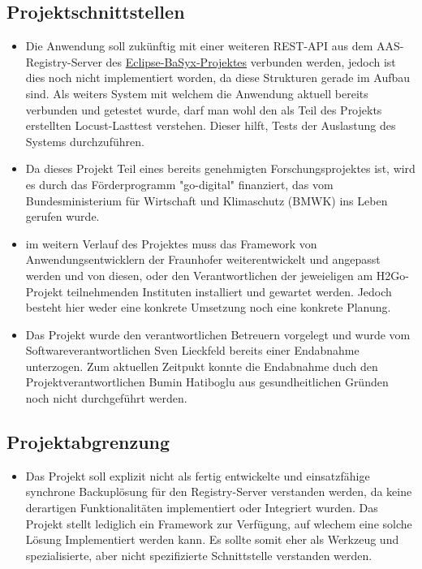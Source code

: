 \subsection{Projektschnittstellen} 
\label{sec:Projektschnittstellen}
\begin{itemize}
	\item Die Anwendung soll zukünftig mit einer weiteren REST-API aus dem AAS-Registry-Server des \href{https://eclipse.dev/basyx/}{Eclipse-BaSyx-Projektes} 
	verbunden werden, jedoch ist dies noch nicht implementiert worden, da diese Strukturen gerade im Aufbau sind. 
	Als weiters System mit welchem die Anwendung aktuell bereits verbunden und getestet wurde, darf man wohl den als Teil des Projekts erstellten Locust-Lasttest 
	verstehen. Dieser hilft, Tests der Auslastung des Systems durchzuführen.
	\item Da dieses Projekt Teil eines bereits genehmigten Forschungsprojektes ist, wird es durch das Förderprogramm "go-digital" finanziert, das vom 
	Bundesministerium für Wirtschaft und Klimaschutz (BMWK) ins Leben gerufen wurde.   
	\item im weitern Verlauf des Projektes muss das Framework von Anwendungsentwicklern der Fraunhofer weiterentwickelt und angepasst werden und von diesen, oder den
	Verantwortlichen der jeweieligen am H2Go-Projekt teilnehmenden Instituten installiert und gewartet werden. Jedoch besteht hier weder eine konkrete Umsetzung noch 
	eine konkrete Planung.  
	\item Das Projekt wurde den verantwortlichen Betreuern vorgelegt und wurde vom Softwareverantwortlichen Sven Lieckfeld bereits einer Endabnahme unterzogen. Zum 
	aktuellen Zeitpukt konnte die Endabnahme duch den Projektverantwortlichen Bumin Hatiboglu aus gesundheitlichen Gründen noch nicht durchgeführt werden.   
\end{itemize}


\subsection{Projektabgrenzung} 
\label{sec:Projektabgrenzung}
\begin{itemize}
	\item Das Projekt soll explizit nicht als fertig entwickelte und einsatzfähige synchrone Backuplösung für den Registry-Server verstanden werden, da keine 
	derartigen Funktionalitäten implementiert oder Integriert wurden. Das Projekt stellt lediglich ein Framework zur Verfügung, auf wlechem eine solche Lösung 
	Implementiert werden kann. Es sollte somit eher als Werkzeug und spezialisierte, aber nicht spezifizierte Schnittstelle verstanden werden.   
\end{itemize}
